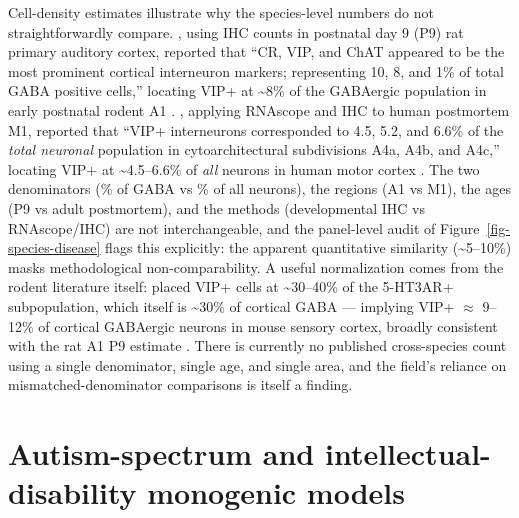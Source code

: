 \documentclass[11pt]{article}
\begin{document}
Cell-density estimates illustrate why the species-level numbers do not
straightforwardly compare. \citet{Ouellet2014}, using IHC counts in
postnatal day 9 (P9) rat primary auditory cortex, reported that ``CR, VIP,
and ChAT appeared to be the most prominent cortical interneuron markers;
representing 10, 8, and 1\% of total GABA positive cells,'' locating VIP+
at {\textasciitilde}8\% of the GABAergic population in early postnatal rodent A1
\citep{Ouellet2014}. \citet{Teymornejad2024a}, applying RNAscope and IHC
to human postmortem M1, reported that ``VIP+ interneurons corresponded to
4.5, 5.2, and 6.6\% of the \textit{total neuronal} population in cytoarchitectural
subdivisions A4a, A4b, and A4c,'' locating VIP+ at {\textasciitilde}4.5--6.6\% of \textit{all}
neurons in human motor cortex \citep{Teymornejad2024a}. The two
denominators (\% of GABA vs \% of all neurons), the regions (A1 vs M1), the
ages (P9 vs adult postmortem), and the methods (developmental IHC vs
RNAscope/IHC) are not interchangeable, and the panel-level audit of
Figure~\ref{fig-species-disease} flags this explicitly: the apparent
quantitative similarity ({\textasciitilde}5--10\%) masks methodological non-comparability.
A useful normalization comes from the rodent literature itself:
\citet{Rudy2011} placed VIP+ cells at {\textasciitilde}30--40\%
of the 5-HT3AR+ subpopulation, which itself is {\textasciitilde}30\% of cortical
GABA --- implying VIP+ $\approx$ 9--12\% of cortical GABAergic neurons in mouse
sensory cortex, broadly consistent with the rat A1 P9 estimate
\citep{Ouellet2014, Rudy2011, Tremblay2016}. There is
currently no published cross-species count using a single denominator,
single age, and single area, and the field's reliance on
mismatched-denominator comparisons is itself a finding.

\section{Autism-spectrum and intellectual-disability monogenic models}
\end{document}
